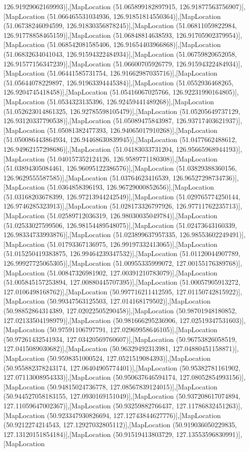 126.91929062169993)],[MapLocation (51.065899182897915, 126.91877563756907)],[MapLocation (51.066465531034936, 126.91851814550364)],[MapLocation (51.06738246094599, 126.91830356878245)],[MapLocation (51.06811059822984, 126.91778858465159)],[MapLocation (51.06848814638593, 126.91705902379954)],[MapLocation (51.068542081585406, 126.91654403966868)],[MapLocation (51.06832634041043, 126.91594322484934)],[MapLocation (51.06759820652058, 126.91577156347239)],[MapLocation (51.06600705926779, 126.91594322484934)],[MapLocation (51.06441585731754, 126.91662987035716)],[MapLocation (51.05644078229897, 126.91963394445384)],[MapLocation (51.0552936468265, 126.9204745418458)],[MapLocation (51.05416067025766, 126.92231990164805)],[MapLocation (51.0534323135396, 126.92459441489268)],[MapLocation (51.052623014861325, 126.92785598105479)],[MapLocation (51.05205649737129, 126.93120337790538)],[MapLocation (51.05089475843987, 126.93717403621937)],[MapLocation (51.05081382477393, 126.94065017910268)],[MapLocation (51.050086443864934, 126.94468630839945)],[MapLocation (51.0477662488612, 126.94962157298686)],[MapLocation (51.04183033731204, 126.95665968944193)],[MapLocation (51.040157352124126, 126.9589771180308)],[MapLocation (51.03894305084461, 126.96095122386576)],[MapLocation (51.03829388360156, 126.9629555587585)],[MapLocation (51.03764623416539, 126.96527298734736)],[MapLocation (51.0364858396193, 126.96729000852656)],[MapLocation (51.03168203678399, 126.97213944242549)],[MapLocation (51.029765774250144, 126.9746285323913)],[MapLocation (51.028173326797926, 126.97711762235713)],[MapLocation (51.02589712036319, 126.98030035049784)],[MapLocation (51.02533027599506, 126.98154489548075)],[MapLocation (51.02473643160339, 126.98334733993876)],[MapLocation (51.023899637957335, 126.98553602249491)],[MapLocation (51.01793367136975, 126.99197332413065)],[MapLocation (51.015250419383875, 126.99464239347532)],[MapLocation (51.01120044907789, 126.99927725065305)],[MapLocation (51.00955335999072, 127.00155176389768)],[MapLocation (51.00847326981902, 127.00391210783079)],[MapLocation (51.005845157253894, 127.00880445707395)],[MapLocation (51.00057905913272, 127.0106498168762)],[MapLocation (50.997716211412595, 127.01150742815922)],[MapLocation (50.99347563125503, 127.014168179502)],[MapLocation (50.98852864314389, 127.02022505290458)],[MapLocation (50.98701948180852, 127.02133504198979)],[MapLocation (50.981666295236906, 127.02519347531603)],[MapLocation (50.97591106797791, 127.02969958646105)],[MapLocation (50.97261432541934, 127.03420569760607)],[MapLocation (50.96753826058519, 127.0415089030682)],[MapLocation (50.96329492313981, 127.04880451158871)],[MapLocation (50.9598351000524, 127.0521519084393)],[MapLocation (50.955882378243174, 127.06404905774401)],[MapLocation (50.95382781161902, 127.07113008954333)],[MapLocation (50.950637646594174, 127.08052854993156)],[MapLocation (50.94815024736778, 127.08567839124015)],[MapLocation (50.944527058183155, 127.0930169151049)],[MapLocation (50.937208617074894, 127.11059647002367)],[MapLocation (50.93259882766437, 127.11786832451263)],[MapLocation (50.923347930826694, 127.12743844627776)],[MapLocation (50.9212274214543, 127.12927032805112)],[MapLocation (50.919036050229835, 127.13120151854184)],[MapLocation (50.91519413803729, 127.13553596830991)],[MapLocation 